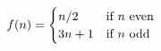 \documentclass[preview]{standalone}
\begin{document}
\begin{align*}
\special{dvisvgm:raw <g id='unique000'>}f(n) = \begin{cases} n/2 & \text{if } n \text{ even} \\ 3n+1 & \text{if } n \text{ odd} \end{cases}\special{dvisvgm:raw </g>}
\end{align*}
\end{document}
